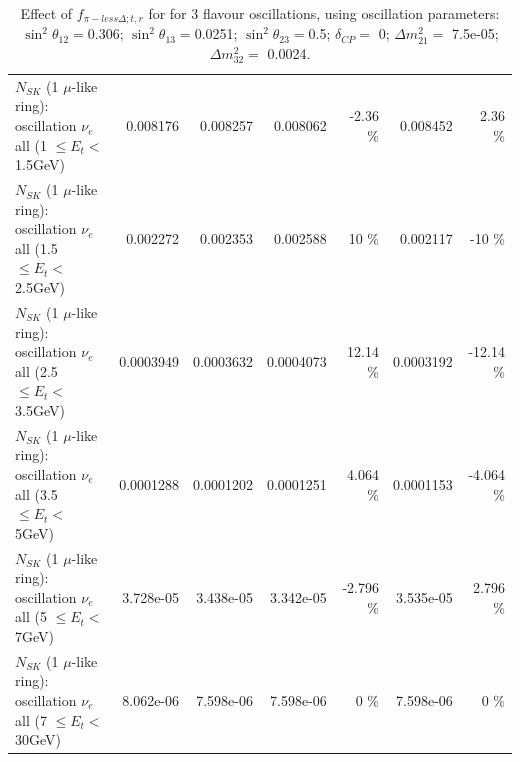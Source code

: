 \begin{table}
\begin{tabular}{| l | r | r | r  r | r  r |}
$N_{SK}$ (1 $\mu$-like ring): oscillation $\nu_{e}$ all (1 $\leq E_{t} <$ 1.5GeV) &        0.008176 &        0.008257 &        0.008062 &    -2.36 \%  &        0.008452 &     2.36 \%  \\ 
$N_{SK}$ (1 $\mu$-like ring): oscillation $\nu_{e}$ all (1.5 $\leq E_{t} <$ 2.5GeV) &        0.002272 &        0.002353 &        0.002588 &       10 \%  &        0.002117 &      -10 \%  \\ 
$N_{SK}$ (1 $\mu$-like ring): oscillation $\nu_{e}$ all (2.5 $\leq E_{t} <$ 3.5GeV) &       0.0003949 &       0.0003632 &       0.0004073 &    12.14 \%  &       0.0003192 &   -12.14 \%  \\ 
$N_{SK}$ (1 $\mu$-like ring): oscillation $\nu_{e}$ all (3.5 $\leq E_{t} <$ 5GeV) &       0.0001288 &       0.0001202 &       0.0001251 &    4.064 \%  &       0.0001153 &   -4.064 \%  \\ 
 $N_{SK}$ (1 $\mu$-like ring): oscillation $\nu_{e}$ all (5 $\leq E_{t} <$ 7GeV) &       3.728e-05 &       3.438e-05 &       3.342e-05 &   -2.796 \%  &       3.535e-05 &    2.796 \%  \\ 
$N_{SK}$ (1 $\mu$-like ring): oscillation $\nu_{e}$ all (7 $\leq E_{t} <$ 30GeV) &       8.062e-06 &       7.598e-06 &       7.598e-06 &        0 \%  &       7.598e-06 &        0 \%  \\ 
\hline
\hline
\end{tabular}
\caption{ Effect of $f_{\pi-less\Delta; t, r}$ for for 3 flavour oscillations, using oscillation parameters:  $\sin^2\theta_{12} = $0.306; $\sin^2\theta_{13} = $0.0251; $\sin^2\theta_{23} = $0.5; $\delta_{CP} = $        0; $\Delta m^2_{21} = $    7.5e-05; $\Delta m^2_{32} = $    0.0024. }
\label{tab:num_xsec_pilessdelta_1RmuT_3f_osc_t13:0.0251}
\end{table}
\clearpage

